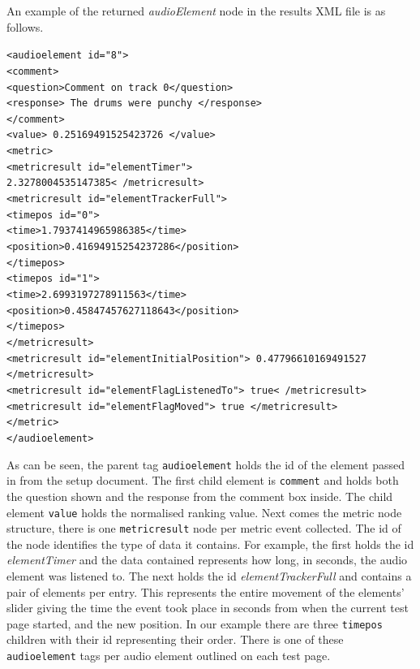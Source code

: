 \documentclass{article}
\begin{document}
An example of the returned \textit{audioElement} node in the results XML file is as follows.

\texttt{<audioelement id="8"> \\
<comment> \\
<question>Comment on track 0</question> \\
<response> The drums were punchy </response> \\
</comment> \\
<value> 0.25169491525423726 </value> \\
<metric> \\
<metricresult id="elementTimer"> \\ 2.3278004535147385< /metricresult> \\
<metricresult id="elementTrackerFull"> \\
<timepos id="0"> \\
<time>1.7937414965986385</time> \\
<position>0.41694915254237286</position> \\
</timepos> \\
<timepos id="1"> \\
<time>2.6993197278911563</time> \\
<position>0.45847457627118643</position> \\
</timepos> \\</metricresult> \\
<metricresult id="elementInitialPosition"> 0.47796610169491527 </metricresult> \\
<metricresult id="elementFlagListenedTo"> true< /metricresult> \\
<metricresult id="elementFlagMoved"> true </metricresult> \\
</metric> \\
</audioelement>}

As can be seen, the parent tag \texttt{audioelement} holds the id of the element passed in from the setup document. The first child element is \texttt{comment} and holds both the question shown and the response from the comment box inside.
The child element \texttt{value} holds the normalised ranking value. Next comes the metric node structure, there is one \texttt{metricresult} node per metric event collected. The id of the node identifies the type of data it contains. For example, the first holds the id \textit{elementTimer} and the data contained represents how long, in seconds, the audio element was listened to. The next holds the id \textit{elementTrackerFull} and contains a pair of elements per entry. This represents the entire movement of the elements' slider giving the time the event took place in seconds from when the current test page started, and the new position. In our example there are three \texttt{timepos} children with their id representing their order. There is one of these \texttt{audioelement} tags per audio element outlined on each test page. 
\end{document}
